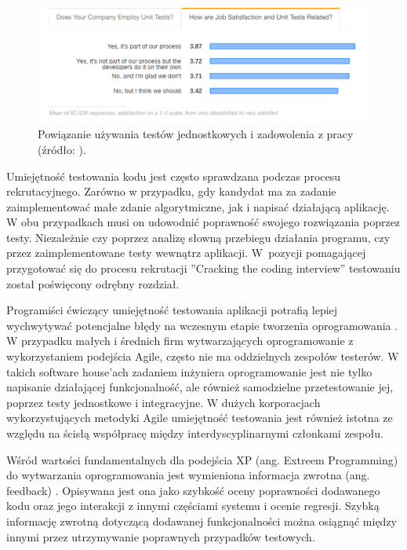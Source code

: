 \begin{figure}[h]
    \centering
    \includegraphics[width = 13cm]{chapter01/unit-tests-satisfaction.png}
    \caption{Powiązanie używania testów jednostkowych i zadowolenia z pracy (źródło: \cite{stack-overflow-survey}).}
    \label{fig:unit-tests-satisfaction}
\end{figure}

Umiejętność testowania kodu jest często sprawdzana podczas procesu rekrutacyjnego.
Zarówno w przypadku, gdy kandydat ma za zadanie zaimplementować małe zdanie algorytmiczne, jak i napisać działającą aplikację.
W obu przypadkach musi on udowodnić poprawność swojego rozwiązania poprzez testy. 
Niezależnie czy poprzez analizę słowną przebiegu działania programu, czy przez zaimplementowane testy wewnątrz aplikacji.
W~pozycji pomagającej przygotować się do procesu rekrutacji ”Cracking the coding interview” \cite{cracking-the-coding-interview} testowaniu został poświęcony odrębny rozdział.

Programiści ćwiczący umiejętność testowania aplikacji potrafią lepiej wychwytywać potencjalne błędy na wczesnym etapie tworzenia oprogramowania \cite{testing-better-error-catch}.
W przypadku małych i średnich firm wytwarzających oprogramowanie z wykorzystaniem podejścia Agile, często nie ma oddzielnych zespołów testerów.
W takich software house'ach zadaniem inżyniera oprogramowanie jest nie tylko napisanie działającej funkcjonalność, ale również samodzielne przetestowanie jej, poprzez testy jednostkowe i integracyjne.
W dużych korporacjach wykorzystujących metodyki Agile umiejętność testowania jest również istotna ze względu na ścisłą współpracę między interdyscyplinarnymi członkami zespołu.

Wśród wartości fundamentalnych dla podejścia XP (ang. Extreem Programming) do wytwarzania oprogramowania jest wymieniona informacja zwrotna (ang. feedback) \cite{extreem-programming}.
Opisywana jest ona jako szybkość oceny poprawności dodawanego kodu oraz jego interakcji z innymi częściami systemu i ocenie regresji.
Szybką informację zwrotną dotyczącą dodawanej funkcjonalności można osiągnąć między innymi przez utrzymywanie poprawnych przypadków testowych.


